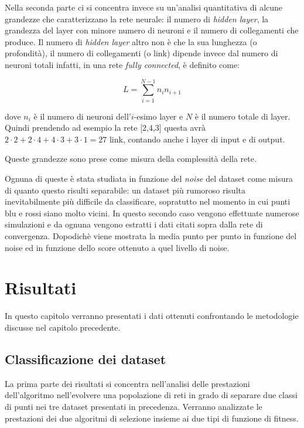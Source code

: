 \documentclass[12pt,a4paper]{report}
\begin{document}
Nella seconda parte ci si concentra invece su un'analisi quantitativa di alcune grandezze che caratterizzano la rete neurale: il numero di \textit{hidden layer}, la grandezza del layer con minore numero di neuroni e il numero di collegamenti che produce.
Il numero di \textit{hidden layer} altro non è che la sua lunghezza (o profondità), il numero di collegamenti (o link) dipende invece dal numero di neuroni totali infatti, in una rete \textit{fully connected}, è definito come:

\begin{equation}
 L = \sum_{i = 1}^{N-1} n_{i}n_{i+1}
\end{equation}

dove $n_{i}$ è il numero di neuroni dell'$i$-esimo layer e $N$ è il numero totale di layer.
Quindi prendendo ad esempio la rete [2,4,3] questa avrà $2\cdot2 + 2\cdot4 + 4\cdot3 + 3\cdot1 = 27$ link, contando anche i layer di input e di output.

Queste grandezze sono prese come misura della complessità della rete.

Ognuna di queste è stata studiata in funzione del \textit{noise} del dataset come misura di quanto questo risulti separabile: un dataset più rumoroso risulta inevitabilmente più difficile da classificare, sopratutto nel momento in cui punti blu e rossi siano molto vicini.
In questo secondo caso vengono effettuate numerose simulazioni e da ognuna vengono estratti i dati citati sopra dalla rete di convergenza.
Dopodichè viene mostrata la media punto per punto in funzione del noise ed in funzione dello score ottenuto a quel livello di noise.




\chapter{Risultati}

In questo capitolo verranno presentati i dati ottenuti confrontando le  metodologie discusse nel capitolo precedente.

\section{Classificazione dei dataset}

La prima parte dei risultati si concentra nell'analisi delle prestazioni dell'algoritmo nell'evolvere una popolazione di reti in grado di separare due classi di punti nei tre dataset presentati in precedenza. Verranno analizzate le prestazioni dei due algoritmi di selezione insieme ai due tipi di funzione di fitness.
\end{document}
